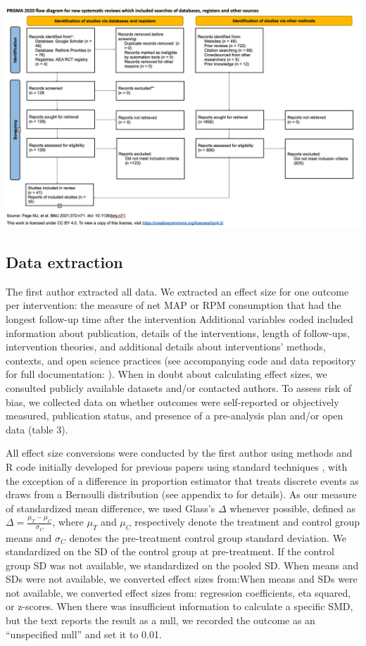 \documentclass[sn-nature,referee,pdflatex]{sn-jnl}
\begin{document}
\begin{center}\includegraphics[width=1.2\linewidth,]{./figures/prisma-diagram} \end{center}

\subsection{Data extraction}\label{sec3.3}

The first author extracted all data. We extracted an effect size for one
outcome per intervention: the measure of net MAP or RPM consumption that
had the longest follow-up time after the intervention Additional
variables coded included information about publication, details of the
interventions, length of follow-ups, intervention theories, and
additional details about interventions' methods, contexts, and open
science practices (see accompanying code and data repository for full
documentation: ). When in doubt about calculating effect sizes, we
consulted publicly available datasets and/or contacted authors. To
assess risk of bias, we collected data on whether outcomes were
self-reported or objectively measured, publication status, and presence
of a pre-analysis plan and/or open data (table 3).

All effect size conversions were conducted by the first author using
methods and R code initially developed for previous papers
\citep{paluck2019, paluck2021, porat2024} using standard techniques
\citep{cooper2019}, with the exception of a difference in proportion
estimator that treats discrete events as draws from a Bernoulli
distribution (see appendix to \citep{paluck2021} for details). As our
measure of standardized mean difference, we used Glass's \(\Delta\)
whenever possible, defined as
\(\Delta = \frac{\mu_T - \mu_C}{\sigma_C}\), where \(\mu_T\) and
\(\mu_C\) respectively denote the treatment and control group means and
\(\sigma_C\) denotes the pre-treatment control group standard deviation.
We standardized on the SD of the control group at pre-treatment. If the
control group SD was not available, we standardized on the pooled SD.
When means and SDs were not available, we converted effect sizes
from:When means and SDs were not available, we converted effect sizes
from: regression coefficients, eta squared, or z-scores. When there was
insufficient information to calculate a specific SMD, but the text
reports the result as a null, we recorded the outcome as an
``unspecified null'' and set it to 0.01.
\end{document}
